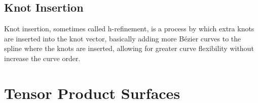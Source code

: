 \subsection{Knot Insertion}
Knot insertion, sometimes called h-refinement, is a process by which extra knots are inserted into the knot vector, basically adding more Bézier curves to the spline where the knots are inserted, allowing for greater curve flexibility without increase the curve order.



\section{Tensor Product Surfaces}

%
%  

 
